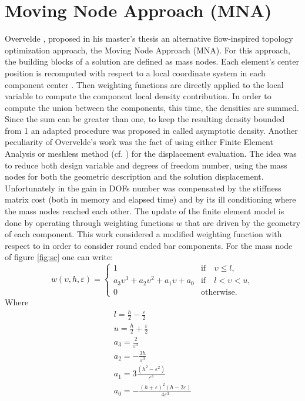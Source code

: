 \section{Moving Node Approach (MNA)}
\label{MNA}
Overvelde \cite{overvelde2012moving}, proposed in his master's thesis an alternative flow-inspired topology optimization approach, the Moving Node Approach (MNA). For this approach, the building blocks of a solution are defined as mass nodes. Each element's center position is recomputed with respect to a local coordinate system in each component center . Then weighting functions are directly applied to the local variable to compute the component local density contribution. In order to compute the union between the components, this time, the densities are summed. Since the sum can be greater than one, to keep the resulting density bounded from 1 an adapted procedure was proposed in \cite{overvelde2012moving} called asymptotic density. Another peculiarity of Overvelde's work was the fact of using either Finite Element Analysis or meshless method (cf. \cite{nguyen2008meshless}) for the displacement evaluation. The idea was to reduce both design variable and degrees of freedom number, using the mass nodes for both the geometric description and the solution displacement. Unfortunately in \cite{overvelde2012moving} the gain in DOFs number was compensated  by the stiffness matrix cost (both in memory and elapsed time) and by its ill conditioning where the mass nodes reached each other. The update of the finite element model is done by operating through weighting functions $w$ that are driven by the geometry of each component. This work considered a modified weighting function with respect to \cite{overvelde2012moving} in order to consider round ended bar components. For the mass node of figure \ref{fig:sc} one can write:
\begin{equation}
\label{eq.MNA.W}
    w(\upsilon,h,\varepsilon)=\begin{cases}
    1 & \text{if} \quad \upsilon\leq l,\\
    a_3\upsilon^3+a_2\upsilon^2+a_1\upsilon+a_0 & \text{if} \quad l<\upsilon<u,\\
    0 & \text{otherwise}.
    \end{cases}
\end{equation}
Where
\begin{eqnarray}
    l=\frac{h}{2}-\frac{\varepsilon}{2} \\  u=\frac{h}{2}+\frac{\varepsilon}{2} \\
    a_3=\frac{2}{\varepsilon^3}\\
    a_2=-\frac{3h}{\varepsilon^3}\\
     a_1=3\frac{\left(h^2-\varepsilon^2\right)}{\varepsilon^3}\\
      a_0=-\frac{(h+\varepsilon)^2(h-2\varepsilon)}{4\varepsilon^3}
\end{eqnarray}
